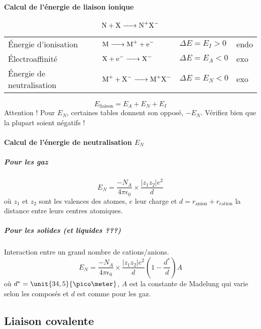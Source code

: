 \documentclass[11pt,a4paper,french]{article}
\begin{document}
\paragraph{Calcul de l'énergie de liaison ionique}
\[ \ce{N + X -> N+X-} \]
\begin{center}
	\begin{tabular}{llll}
		\'Energie d'ionisation & $\ce{M -> M+ + e-}$ & $\Delta E = E_I > 0$ & endo\\
		\'Electroaffinité & $\ce{X + e- -> X-}$ & $\Delta E = E_A < 0$ & exo\\
		\'Energie de neutralisation & $\ce{M+ + X- -> M+X-}$ & $\Delta E = E_N < 0$ & exo
	\end{tabular}
\end{center}
\[ E_{\mathrm{liaison}} = E_A + E_N + E_I \]
Attention !
Pour $E_N$, certaines tables donnent son opposé, $-E_N$. Vérifiez bien que la plupart soient négatifs !

\paragraph{Calcul de l'énergie de neutralisation $E_N$}

\subparagraph{Pour les gaz}
\[ E_N = \frac{-N_A}{4\pi\epsilon_0}\times\frac{|z_1z_2|e^2}{d} \]
où $z_1$ et $z_2$ sont les valences des atomes, $e$ leur charge et $d = r_{\mathrm{anion}} + r_{\mathrm{cation}}$ la distance entre leurs centres atomiques.
\subparagraph{Pour les solides (et liquides ???)}
Interaction entre un grand nombre de cations/anions.
\[ E_N = \frac{-N_A}{4\pi\epsilon_0}\times\frac{|z_1z_2|e^2}{d} \left(1-\frac{d^*}{d}\right)A \]
où $d^* = \unit{34,5}{\pico\meter}$, $A$ est la constante de Madelung qui varie selon les composés et $d$ est comme pour les gaz.

\subsection{Liaison covalente}
\end{document}
